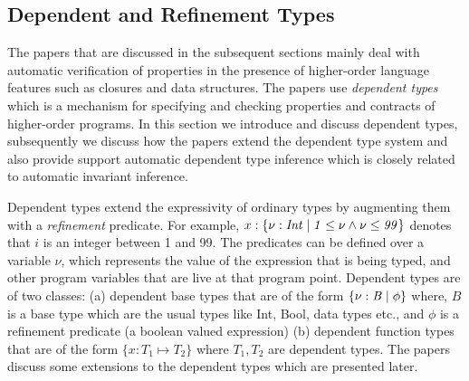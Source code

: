 \newcommand{\dt}[2]{\mathit{\{ #1 \vbar #2\}}}
\newcommand{\subtype}{\mathit{<:}}
\newcommand{\sem}[1]{\sembrack{#1}}

\subsection{Dependent and Refinement Types}

The papers that are discussed in the subsequent sections mainly deal with 
automatic verification of properties in the presence of higher-order language features such as closures and data structures.
The papers use \emph{dependent types} which is a mechanism for specifying and checking properties and contracts of higher-order programs. In this section we introduce and discuss dependent types, subsequently we discuss how the papers extend the dependent type system and also provide support automatic dependent type inference which is closely related to automatic invariant inference.

Dependent types extend the expressivity of ordinary types by augmenting them with a \emph{refinement} predicate. For example, $x:\dt{\nu: Int}{1 \le \nu \wedge \nu \le 99}$ denotes that $i$ is an integer between 1 and 99. The predicates can be defined over a variable $\nu$, which represents the value of the expression that is being typed, and other program variables that are live at that program point.
Dependent types are of two classes: (a) dependent base types that are of the form $\dt{\nu:B}{\phi}$ where, $B$ is a base type which are the usual types like Int, Bool, data types etc., and $\phi$ is a refinement predicate (a boolean valued expression)
(b) dependent function types that are of the form $\{ x:T_1 \mapsto T_2\}$ 
where $T_1,T_2$ are dependent types.
The papers discuss some extensions to the dependent types which are presented later.
 
